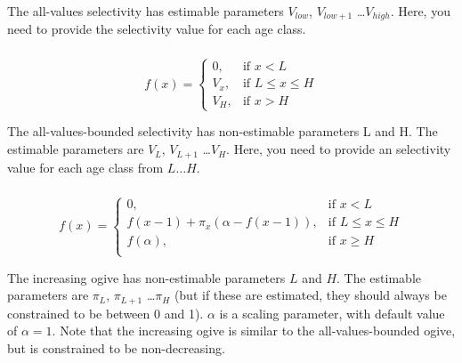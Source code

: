 The all-values selectivity has estimable parameters $V_{low}$, $V_{low+1}$ \ldots $V_{high}$. Here, you need to provide the selectivity value for each age class.

\subsubsection[All-values-bounded]{}

\begin{equation}
f(x)=\begin{cases}
		 0, & \text{if $x < L$} \\
		 V_x, & \text{if $L \le x \le H$} \\
		 V_H, & \text{if $x > H$}
  \end{cases}
\end{equation}

The all-values-bounded selectivity has non-estimable parameters L and H. The estimable parameters are $V_L$, $V_{L+1}$ \ldots $V_H$. Here, you need to provide an selectivity value for each age class from $L \ldots H$.

\subsubsection[Increasing]{}

\begin{equation}
f(x)=\begin{cases}
	  0, & \text{if $x < L$} \\
	  f(x-1)+ \pi_x(\alpha-f(x-1)), & \text{if $L \le x \le H$} \\
	  f(\alpha), & \text{if $x \ge H$} \\
  \end{cases}
\end{equation}

The increasing ogive has non-estimable parameters $L$ and $H$. The estimable parameters are $\pi_L$, $\pi_{L+1}$ \ldots $\pi_H$ (but if these are estimated, they should always be constrained to be between 0 and 1). $\alpha$ is a scaling parameter, with default value of $\alpha = 1$. Note that the increasing ogive is similar to the all-values-bounded ogive, but is constrained to be non-decreasing.

\subsubsection[Logistic]{}

